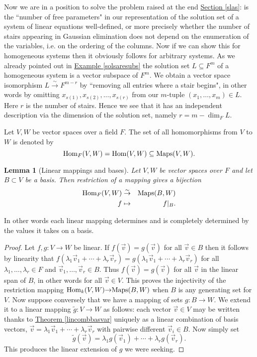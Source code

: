 \documentclass[11pt]{amsbook}
\newtheorem{lemma}[theorem]{Lemma}
\theoremstyle{definition}
\begin{document}
Now we are in a position to solve the problem raised at the end \hyperref[theshotthatshooktheworld]{Section \ref{slas}}: is the ``number of free parameters" in our representation of the solution set of a system of linear equations well-defined, or more precisely whether the number of stairs appearing in Gaussian elimination does not depend on the enumeration of the variables, i.e. on the ordering of the columns. Now if we can show this for homogeneous systems then it obviously follows for arbitrary systems. As we already pointed out in \hyperref[solsaresubs]{Example \ref{solsaresubs}} the solution set $L\subseteq F^m$ of a homogeneous system is a vector subspace of $F^m$. We obtain a vector space isomorphism $L\stackrel{\sim}{\to} F^{m-r}$ by ``removing all entries where a stair begins", in other words by omitting $x_{s(1)}, x_{s(2)}, \ldots , x_{s(r)}$ from our $m$-tuple $(x_1, \ldots , x_m)\in L$. Here $r$ is the number of stairs. Hence we see that it has an independent description via the dimension of the solution set, namely $r = m - \dim_F L.$
\medskip

Let $V,W$ be vector spaces over a field $F$. The set of all homomorphisms from $V$ to $W$ is denoted by $${\rm Hom}_F (V,W) = {\rm Hom}(V,W) \subseteq {\rm Maps}(V,W).$$

\begin{lemma}[Linear mappings and bases] \label{linmapbas} Let $V,W$ be vector spaces over $F$ and let $B\subset V$ be a basis. Then restriction of a mapping gives a bijection \begin{eqnarray*} {\rm Hom}_F(V,W) &\stackrel{\sim}{\to}& {\rm Maps}(B, W)\\ f&\mapsto & f|_B.\end{eqnarray*}
\end{lemma}
In other words each linear mapping determines and is completely determined by the values it takes on a basis.
\begin{proof}
Let $f,g: V\to W$ be linear. If $f(\vec{v}) = g(\vec{v})$ for all $\vec{v}\in B$ then it follows by linearity that $f(\lambda_1\vec{v}_1 + \cdots + \lambda_r \vec{v}_r) = g(\lambda_1 \vec{v}_1 + \cdots + \lambda_r \vec{v}_r)$ for all $\lambda_1, \ldots , \lambda_r\in F$ and $\vec{v}_1, \ldots , \vec{v}_r \in B$. Thus $f(\vec{v}) = g(\vec{v})$ for all $\vec{v}$ in the linear span of $B$, in other words for all $\vec{v}\in V$. This proves the injectivity of the restriction mapping ${\rm Hom}_k(V,W) {\to} {\rm Maps}(B, W)$ when $B$ is any generating set for $V$. Now suppose conversely that we have a mapping of sets $g:B \to W$. We extend it to a linear mapping $\tilde{g}:V \to W$ as follows: each vector $\vec{v}\in V$ may be written thanks to \hyperref[lincombbasvar]{Theorem \ref{lincombbasvar}} uniquely as a linear combination of basis vectors, $\vec{v} = \lambda_1 \vec{v}_1 + \cdots + \lambda_r \vec{v}_r$ with pairwise different $\vec{v}_i\in B$. Now simply set $$\tilde{g}(\vec{v}) = \lambda_1 g(\vec{v}_1) + \cdots + \lambda_r g (\vec{v}_r).$$ This produces the linear extension of $g$ we were seeking.\end{proof}
\end{document}
